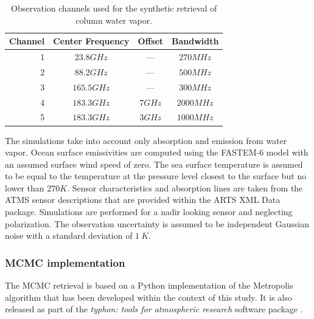 \documentclass[journal abbreviation, manuscript]{copernicus}
\begin{document}
\begin{table}[hbpt]
\centering
\begin{tabular}{|r|c|c|c|}
    \hline
    Channel & Center Frequency & Offset           & Bandwidth                \\ 
    \hline
                  1 & $23.8 \unit{GHz}$ &        ---       & $270 \unit{MHz}$ \\
                  2 & $88.2 \unit{GHz}$ &        ---       & $500 \unit{MHz}$ \\
                  3 & $165.5\unit{GHz}$ &        ---       & $300 \unit{MHz}$ \\
                  4 & $183.3\unit{GHz}$ & $7   \unit{GHz}$ & $2000\unit{MHz}$ \\
                  5 & $183.3\unit{GHz}$ & $3   \unit{GHz}$ & $1000\unit{MHz}$ \\
    \hline
\end{tabular}
\caption{Observation channels used for the synthetic retrieval of column water vapor.}
\label{tab:channels}
\end{table}

The simulations take into account only absorption and emission from water vapor.
Ocean surface emissivities are computed using the FASTEM-6 \citep{fastem6} model
with an assumed surface wind speed of zero. The sea surface temperature is
assumed to be equal to the temperature at the pressure level closest to the
surface but no lower than $270\unit{K}$. Sensor characteristics and absorption
lines are taken from the ATMS sensor descriptions that are provided within the
ARTS XML Data package. Simulations are performed for a nadir looking sensor and
neglecting polarization. The observation uncertainty is assumed to be
independent Gaussian noise with a standard deviation of $1\:\unit{K}$.


\subsubsection{MCMC implementation}

  The MCMC retrieval is based on a Python implementation of the Metropolis
  algorithm \citep[Ch. 12]{bda} that has been developed within the context of
  this study. It is also released as part of the \textit{typhon: tools for atmospheric
  research} software package \citep{typhon}.
\end{document}

